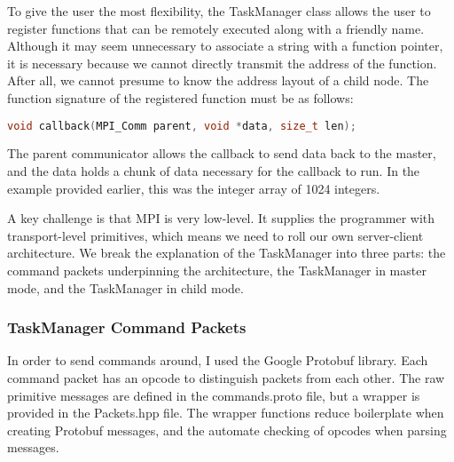 \documentclass[11pt]{article}
\begin{document}
            To give the user the most flexibility, the TaskManager class allows the user to register functions
            that can be remotely executed along with a friendly name. Although it may seem unnecessary to associate
            a string with a function pointer, it is necessary because we cannot directly transmit the address of
            the function. After all, we cannot presume to know the address layout of a child node. The function
            signature of the registered function must be as follows:
            
            \begin{lstlisting}[language=C++]
void callback(MPI_Comm parent, void *data, size_t len);
            \end{lstlisting}
            
            The parent communicator allows the callback to send data back to the master, and the data holds a
            chunk of data necessary for the callback to run. In the example provided earlier, this was the 
            integer array of 1024 integers.
            
            A key challenge is that MPI is very low-level. It supplies the programmer with transport-level primitives,
            which means we need to roll our own server-client architecture. We break the explanation of the TaskManager into three parts: the command packets underpinning the
            architecture, the TaskManager in master mode, and the TaskManager in child mode.
            
            \subsubsection{TaskManager Command Packets}
                In order to send commands around, I used the Google Protobuf library. Each command packet has
                an opcode to distinguish packets from each other. The raw primitive messages are
                defined in the commands.proto file, but a wrapper is provided in the Packets.hpp file.
                The wrapper functions reduce boilerplate when creating Protobuf messages, and the automate
                checking of opcodes when parsing messages.
                
\end{document}
